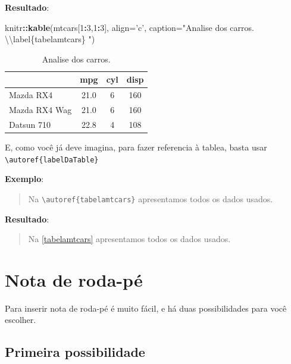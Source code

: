 \documentclass[]{book}
\newenvironment{Shaded}{\begin{snugshade}}{\end{snugshade}}
\newcommand{\CharTok}[1]{\textcolor[rgb]{0.31,0.60,0.02}{#1}}
\newcommand{\DataTypeTok}[1]{\textcolor[rgb]{0.13,0.29,0.53}{#1}}
\newcommand{\DecValTok}[1]{\textcolor[rgb]{0.00,0.00,0.81}{#1}}
\newcommand{\KeywordTok}[1]{\textcolor[rgb]{0.13,0.29,0.53}{\textbf{#1}}}
\newcommand{\NormalTok}[1]{#1}
\newcommand{\OperatorTok}[1]{\textcolor[rgb]{0.81,0.36,0.00}{\textbf{#1}}}
\newcommand{\StringTok}[1]{\textcolor[rgb]{0.31,0.60,0.02}{#1}}
\begin{document}
\textbf{Resultado}:

\begin{Shaded}
\begin{Highlighting}[]
\NormalTok{knitr}\OperatorTok{::}\KeywordTok{kable}\NormalTok{(mtcars[}\DecValTok{1}\OperatorTok{:}\DecValTok{3}\NormalTok{,}\DecValTok{1}\OperatorTok{:}\DecValTok{3}\NormalTok{], }\DataTypeTok{align=}\StringTok{'c'}\NormalTok{, }\DataTypeTok{caption=}\StringTok{"Analise dos carros. }\CharTok{\textbackslash{}\textbackslash{}}\StringTok{label\{tabelamtcars\} "}\NormalTok{)}
\end{Highlighting}
\end{Shaded}

\begin{table}

\caption{\label{tab:unnamed-chunk-7}Analise dos carros. \label{tabelamtcars} }
\centering
\begin{tabular}[t]{l|c|c|c}
\hline
  & mpg & cyl & disp\\
\hline
Mazda RX4 & 21.0 & 6 & 160\\
\hline
Mazda RX4 Wag & 21.0 & 6 & 160\\
\hline
Datsun 710 & 22.8 & 4 & 108\\
\hline
\end{tabular}
\end{table}

E, como você já deve imagina, para fazer referencia à tablea, basta usar \texttt{\textbackslash{}autoref\{labelDaTable\}}

\textbf{Exemplo}:

\begin{quote}
Na \texttt{\textbackslash{}autoref\{tabelamtcars\}} apresentamos todos os dados usados.
\end{quote}

\textbf{Resultado}:

\begin{quote}
Na \autoref{tabelamtcars} apresentamos todos os dados usados.
\end{quote}

\hypertarget{nota-de-roda-puxe9}{%
\chapter{Nota de roda-pé}\label{nota-de-roda-puxe9}}

Para inserir nota de roda-pé é muito fácil, e há duas possibilidades para você escolher.

\hypertarget{op1}{%
\section{Primeira possibilidade}\label{op1}}
\end{document}
